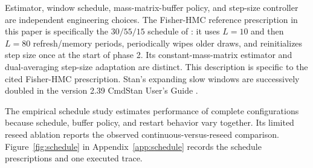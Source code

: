 \documentclass[11pt]{article}
\theoremstyle{plain}
\theoremstyle{definition}
\theoremstyle{remark}
\begin{document}
Estimator, window schedule, mass-matrix-buffer policy, and step-size controller
are independent engineering choices. The Fisher-HMC reference prescription in
this paper is specifically the $30/55/15$ schedule of
\citet{seyboldt2026preconditioning}: it uses $L=10$ and then $L=80$
refresh/memory periods, periodically wipes older draws, and reinitializes step
size once at the start of phase 2. Its constant-mass-matrix estimator and
dual-averaging step-size adaptation are distinct. This description is specific
to the cited Fisher-HMC prescription. Stan's expanding slow windows are
successively doubled in the version 2.39 CmdStan User's Guide
\citep{cmdstan239warmup}.

The empirical schedule study estimates performance of complete configurations
because schedule, buffer policy, and restart behavior vary together. Its
limited reseed ablation reports the observed continuous-versus-reseed
comparison. Figure~\ref{fig:schedule} in Appendix~\ref{app:schedule} records
the schedule prescriptions and one executed trace.
\end{document}
